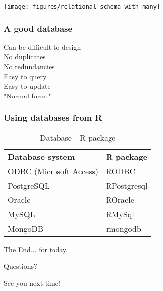 \documentclass{beamer}
\begin{document}
\begin{frame}
	\begin{center}
		\texttt{[image: figures/relational\_schema\_with\_many]}
	\end{center}
\end{frame}

\begin{frame}
	\frametitle{A good database}
	\begin{center}
		Can be difficult to design \\
		No duplicates \\
		No redundancies \\
		Easy to query \\
		Easy to update \\
		"Normal forms" \\
	\end{center}
\end{frame}

\begin{frame}
	\frametitle{Using databases from R}
	\begin{table}[t]
		\begin{center}
			\begin{tabular}{ l l }
				\textbf{Database system} & 
				\textbf{R package} \\
				ODBC (Microsoft Access) & RODBC \\
				PostgreSQL & RPostgresql \\
				Oracle & ROracle \\
				MySQL & RMySql \\
				MongoDB & rmongodb \\
			\end{tabular}
		\end{center}
		\caption{Database - R package}
	\end{table}
\end{frame}


\begin{frame}
\Huge{\centerline{The End... for today.}}
\Huge{\centerline{Questions?}}
\Huge{\centerline{See you next time!}}
\end{frame}

\end{document}
